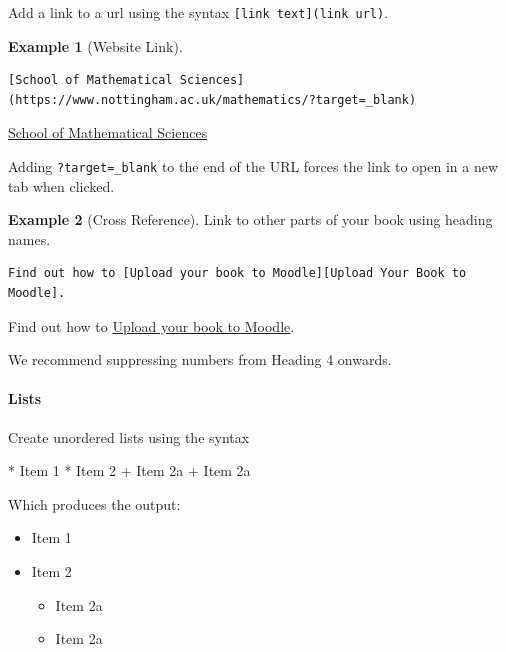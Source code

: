 \documentclass[
]{article}
\newenvironment{Shaded}{\begin{snugshade}}{\end{snugshade}}
\newcommand{\NormalTok}[1]{#1}
\newcommand{\SpecialStringTok}[1]{\textcolor[rgb]{0.31,0.60,0.02}{#1}}
\providecommand{\tightlist}{%
  \setlength{\itemsep}{0pt}\setlength{\parskip}{0pt}}
\numberwithin{equation}{section}
\numberwithin{figure}{section}
\theoremstyle{break}
\theoremstyle{definition}
\theoremstyle{definition}
\newtheorem{example}{Example}[section]
\theoremstyle{definition}
\theoremstyle{definition}
\theoremstyle{remark}
\begin{document}
Add a link to a url using the syntax \texttt{{[}link\ text{]}(link\ url)}.

\begin{example}[Website Link]
\leavevmode

\begin{verbatim}
[School of Mathematical Sciences](https://www.nottingham.ac.uk/mathematics/?target=_blank)
\end{verbatim}

\href{https://www.nottingham.ac.uk/mathematics/?target=_blank}{School of Mathematical Sciences}

Adding \texttt{?target=\_blank} to the end of the URL forces the link to open in a new tab when clicked.

\end{example}

\begin{example}[Cross Reference]
Link to other parts of your book using heading names.

\begin{verbatim}
Find out how to [Upload your book to Moodle][Upload Your Book to Moodle].
\end{verbatim}

Find out how to \protect\hyperlink{upload-your-book-to-moodle}{Upload your book to Moodle}.
\end{example}

We recommend suppressing numbers from Heading 4 onwards.

\hypertarget{lists}{%
\paragraph*{Lists}\label{lists}}

Create unordered lists using the syntax

\begin{Shaded}
\begin{Highlighting}[]
\SpecialStringTok{* }\NormalTok{Item 1}
\SpecialStringTok{* }\NormalTok{Item 2}
\SpecialStringTok{    + }\NormalTok{Item 2a}
\SpecialStringTok{    + }\NormalTok{Item 2a}
\end{Highlighting}
\end{Shaded}

Which produces the output:

\begin{itemize}
\tightlist
\item
  Item 1
\item
  Item 2

  \begin{itemize}
  \tightlist
  \item
    Item 2a
  \item
    Item 2a
  \end{itemize}
\end{itemize}
\end{document}
